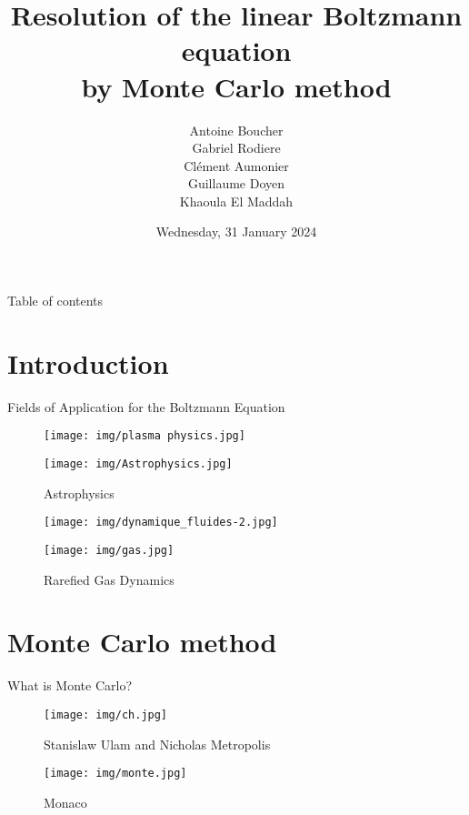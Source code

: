 \documentclass[aspectratio=1610]{beamer}
\title{Resolution of the linear Boltzmann equation\\ by Monte Carlo method}
\subtitle{}
\author{
	Antoine Boucher\\
	Gabriel Rodiere\\
	Clément Aumonier\\
	Guillaume Doyen\\
	Khaoula El Maddah\\
}
\institute{}
\date{Wednesday, 31\up{st} January 2024}
\begin{document}
\begin{frame}[plain]
  \titlepage
\end{frame}

\begin{frame}{Table of contents}
  \tableofcontents
\end{frame}

\section{Introduction}
\begin{frame}{Fields of Application for the Boltzmann Equation}

\begin{multicols}{2}
    \begin{figure}
      \centering
      \texttt{[image: img/plasma physics.jpg]}
      \caption *{Plasma physics}
      
      \texttt{[image: img/Astrophysics.jpg]}
      \caption*{Astrophysics}
    \end{figure}

    \begin{figure}
      \centering
      \texttt{[image: img/dynamique\_fluides-2.jpg]}
      \caption *{Fluid dynamic}
      
      \texttt{[image: img/gas.jpg]}
      \caption*{Rarefied Gas Dynamics}
    \end{figure}
\end{multicols}

\end{frame}

\section{Monte Carlo method}
\begin{frame}{What is Monte Carlo?}
  \begin{figure}
    \begin{minipage}{0.48\textwidth}
      \centering
      \texttt{[image: img/ch.jpg]}
      \caption*{Stanislaw Ulam and Nicholas Metropolis}
      \label{fig:persons}
    \end{minipage}\hfill
    \begin{minipage}{0.48\textwidth}
      \centering
      \texttt{[image: img/monte.jpg]}
      \caption*{Monaco}
      \label{fig:monte}
    \end{minipage}
  \end{figure}
\end{frame}
\end{document}
